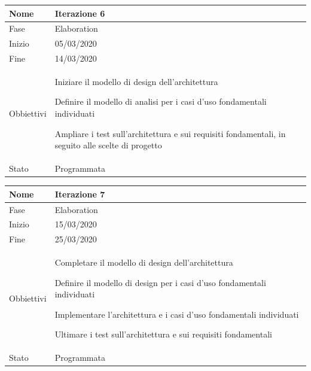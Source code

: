 \begin{center}
\begin{tabular}{ |p{2cm}|p{10cm}|  }
\hline
Nome & Iterazione 6 \\\hline
Fase & Elaboration \\\hline
Inizio & 05/03/2020 \\\hline
Fine &  14/03/2020  \\\hline
Obbiettivi & 
	\begin{compactitem}		
		\item Iniziare il modello di design dell'architettura
		\item Definire il modello di analisi per i casi d'uso fondamentali individuati
		\item Ampliare i test sull'architettura e sui requisiti fondamentali, in seguito alle scelte di progetto		

	\end{compactitem}\\\hline
Stato &  Programmata \\\hline
\end{tabular}
\label{table:6}\newline

\begin{tabular}{ |p{2cm}|p{10cm}|  }
\hline
Nome & Iterazione 7 \\\hline
Fase & Elaboration \\\hline
Inizio & 15/03/2020 \\\hline
Fine & 25/03/2020 \\\hline
Obbiettivi & 
	\begin{compactitem}
		\item Completare il modello di design dell'architettura
		\item Definire il modello di design per i casi d'uso fondamentali individuati
		\item Implementare l'architettura e i casi d'uso fondamentali individuati
		\item Ultimare i test sull'architettura e sui requisiti fondamentali
	\end{compactitem}\\\hline
Stato &  Programmata \\\hline
\end{tabular}
\label{table:7}\newline


\end{center}
